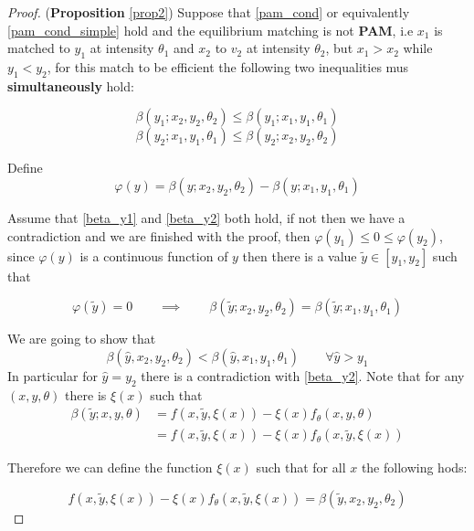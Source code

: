 \documentclass[12pt]{article}
\theoremstyle{definition}
\newcommand{\qiq}{\qquad \implies \qquad}
\begin{document}
\begin{proof}
(\textbf{Proposition} \ref{prop2}) Suppose that \eqref{pam_cond} or equivalently \eqref{pam_cond_simple} hold and the equilibrium matching is not \textbf{PAM}, i.e  $x_{1}$ is matched to $y_{1}$ at intensity $\theta_{1}$ and $x_{2}$ to $v_{2}$ at intensity $\theta_{2}$, but $x_{1}>x_{2}$ while $y_{1}<y_{2}$, for this match to be efficient the following two inequalities mus \textbf{simultaneously} hold:

\begin{equation}\label{beta_y1}
    \beta(y_1; x_2, y_2, \theta_2) \leq \beta(y_1; x_1, y_1, \theta_1) 
\end{equation}
\begin{equation}\label{beta_y2}
    \beta(y_2; x_1, y_1, \theta_1) \leq \beta(y_2; x_2, y_2, \theta_2) 
\end{equation}

Define $$\varphi(y) = \beta(y; x_2, y_2, \theta_2) - \beta(y; x_1, y_1, \theta_1) $$

Assume that \eqref{beta_y1} and \eqref{beta_y2} both hold, if not then we have a contradiction and we are finished with the proof, then $\varphi(y_1)\leq0\leq \varphi(y_2)$, since $\varphi(y)$ is a continuous function of $y$ then there is a value $\tilde{y} \in [y_1, y_2]$ such that 

\begin{equation}\label{definition_varphi}
    \varphi(\tilde{y}) = 0 \qiq  \beta(\tilde{y}; x_2, y_2, \theta_2) = \beta(\tilde{y}; x_1, y_1, \theta_1) 
\end{equation}

We are going to show that 
\begin{equation}\label{contradiction}
\beta(\hat{y},x_2,y_2,\theta_2)<\beta(\hat{y}, x_1, y_1, \theta_1)\qquad \forall \hat{y}>y_1 
\end{equation}
In particular for $\hat{y} = y_2$ there is a contradiction with \eqref{beta_y2}. 
Note that for any $(x,y,\theta)$ there is $\xi(x)$ such that
\begin{align*}
    \beta(\tilde{y};x,y,\theta) & = f(x,\tilde{y}, \xi(x)) - \xi(x)f_\theta(x,y,\theta)\\&=f(x,\tilde{y}, \xi(x)) - \xi(x)f_\theta(x,\tilde{y}, \xi(x))
\end{align*}

Therefore we can define the function $\xi(x)$ such that for all $x$ the following hods:

\begin{equation}\label{def_xi_1}
f(x,\tilde{y},\xi(x)) - \xi(x)f_\theta(x,\tilde{y}, \xi(x)) = \beta(\tilde{y},x_2,y_2,\theta_2)
\end{equation}


\end{proof}
\end{document}
